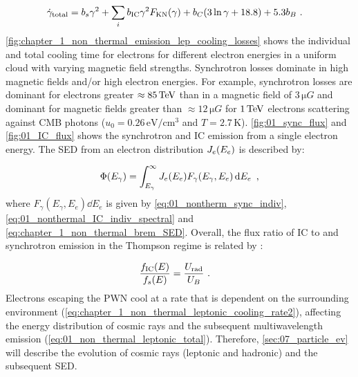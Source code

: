 \begin{equation}
    \begin{aligned}
    \dot{\gamma}_\text{total}&=b_s\gamma^2+\sum_{i} b_\text{IC}\gamma^2F_\text{KN}\qty(\gamma)+b_C\qty(3\ln \gamma+18.8)+5.3b_B \text{ .}
    \end{aligned} \label{eq:chapter_1_non_thermal_leptonic_cooling_rate2}
\end{equation}
\noindent \autoref{fig:chapter_1_non_thermal_emission_lep_cooling_losses} shows the individual and total cooling time for electrons for different electron energies in a uniform cloud with varying magnetic field strengths. Synchrotron losses dominate in high magnetic fields and/or high electron energies. For example, synchrotron losses are dominant for electrons greater $\approx 85\,\TeV$ than in a magnetic field of $3\,\si{\micro G}$ and dominant for magnetic fields greater than $\approx 12\,\si{\micro G}$ for $1\,\TeV$ electrons scattering against CMB photons ($u_0=0.26\,\si{\electronvolt\per\centi\meter\cubed}$ and $T=2.7\,\si{\kelvin}$). 
\newpar 
\autoref{fig:01_sync_flux} and \autoref{fig:01_IC_flux} shows the synchrotron and IC emission from a single electron energy. The SED from an electron distribution $J_e\qty(E_e)$ is described by:

\begin{equation}
    \begin{aligned}
        \Phi\qty(E_\gamma)= \int_{E_\gamma}^\infty J_e\qty(E_e) F_\gamma(E_\gamma,E_e)\dd{E_e}\text{ ,}
    \end{aligned} \label{eq:01_non_thermal_leptonic_total}
\end{equation}
\noindent where $F_\gamma(E_\gamma,E_e)\dd{E_e}$ is given by \autoref{eq:01_nontherm_sync_indiv}, \autoref{eq:01_nonthermal_IC_indiv_spectral} and \autoref{eq:chapter_1_non_thermal_brem_SED}. Overall, the flux ratio of IC to and synchrotron emission in the Thompson regime is related by \citep{1997MNRAS.291..162A}:

\begin{equation}
    \begin{aligned}
    \frac{f_\text{IC}\qty(E)}{f_s\qty(E)}&=\frac{U_\text{rad}}{U_B}\text{ .}
    \end{aligned} \label{eq:chapter_IC_2_sync_ratio}
\end{equation}
\newpar
Electrons escaping the PWN cool at a rate that is dependent on the surrounding environment (\autoref{eq:chapter_1_non_thermal_leptonic_cooling_rate2}), affecting the energy distribution of cosmic rays and the subsequent multiwavelength emission (\autoref{eq:01_non_thermal_leptonic_total}). Therefore, \autoref{sec:07_particle_ev} will describe the evolution of cosmic rays (leptonic and hadronic) and the subsequent SED.
